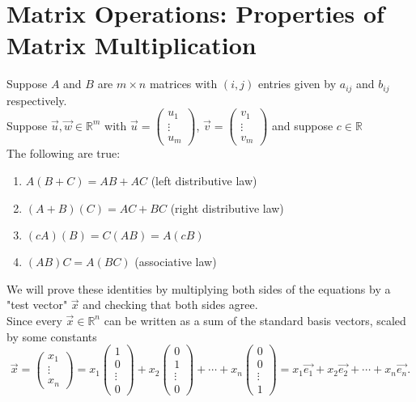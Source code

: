 \documentclass{report}
\begin{document}
\section{Matrix Operations: Properties of Matrix Multiplication}
Suppose $ A$ and $ B$ are $ m \times  n$ matrices with $ (i,j) $ entries given by $ a_{ij}$ and $ b_{ij}$ respectively.\\
Suppose $ \vec{ u} , \vec{ w} \in \mathbb{R} ^{m}$ with $ \vec{ u} = \begin{pmatrix} u_1\\ \vdots\\ u_m \end{pmatrix} $, $ \vec{ v} = \begin{pmatrix} v_1\\ \vdots\\ v_m \end{pmatrix}$ and  suppose $ c \in \mathbb{R}$ \\
The following are true:
\begin{enumerate}[label=(\roman*)]
  \item $ A \left( B+C \right) = AB +AC $  (left distributive law)
  \item  $ \left( A + B \right) \left( C \right) = AC +BC$ (right distributive law)
  \item  $ \left( c A \right) \left( B \right) = C \left( AB \right) = A \left( cB \right) $
  \item $ \left( AB \right) C = A \left( BC \right) $ (associative law) 
  \end{enumerate}
  We will prove these identities by multiplying both sides of the equations by a "test vector" $ \vec{ x} $ and checking that both sides agree.\\
  Since every $ \vec{ x} \in \mathbb{R} ^{n}$ can be written as a sum of the standard basis vectors, scaled by some constants
  \[
  \vec{ x} = \begin{pmatrix} x_1\\ \vdots\\ x_n \end{pmatrix}= x_1 \begin{pmatrix} 1\\ 0\\ \vdots\\ 0 \end{pmatrix} + x_2 \begin{pmatrix} 0\\ 1\\ \vdots\\ 0 \end{pmatrix} + \cdots + x_n \begin{pmatrix} 0\\ 0\\ \vdots\\ 1 \end{pmatrix} = x_1 \vec{ e_1} + x_2 \vec{ e_2} + \cdots + x_n \vec{ e_n}
  .\] 
\end{document}
